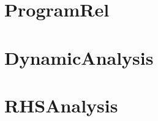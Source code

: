 \section{ProgramRel}
\label{sec:program-rel}

\section{DynamicAnalysis}
\label{sec:dynamic-analysis}

\section{RHSAnalysis}
\label{sec:rhs-analysis}




